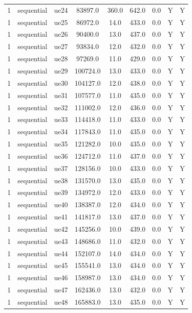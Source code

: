 \begin{table}[ht]
\begin{tabular}{|c|c|c|c|c|c|c|c|c|}
1 & sequential & ue24 & 83897.0 & 360.0 & 642.0 & 0.0 & Y & Y \\
1 & sequential & ue25 & 86972.0 & 14.0 & 433.0 & 0.0 & Y & Y \\
1 & sequential & ue26 & 90400.0 & 13.0 & 437.0 & 0.0 & Y & Y \\
1 & sequential & ue27 & 93834.0 & 12.0 & 432.0 & 0.0 & Y & Y \\
1 & sequential & ue28 & 97269.0 & 11.0 & 429.0 & 0.0 & Y & Y \\
1 & sequential & ue29 & 100724.0 & 13.0 & 433.0 & 0.0 & Y & Y \\
1 & sequential & ue30 & 104127.0 & 12.0 & 438.0 & 0.0 & Y & Y \\
1 & sequential & ue31 & 107577.0 & 11.0 & 435.0 & 0.0 & Y & Y \\
1 & sequential & ue32 & 111002.0 & 12.0 & 436.0 & 0.0 & Y & Y \\
1 & sequential & ue33 & 114418.0 & 11.0 & 433.0 & 0.0 & Y & Y \\
1 & sequential & ue34 & 117843.0 & 11.0 & 435.0 & 0.0 & Y & Y \\
1 & sequential & ue35 & 121282.0 & 10.0 & 435.0 & 0.0 & Y & Y \\
1 & sequential & ue36 & 124712.0 & 11.0 & 437.0 & 0.0 & Y & Y \\
1 & sequential & ue37 & 128156.0 & 10.0 & 433.0 & 0.0 & Y & Y \\
1 & sequential & ue38 & 131570.0 & 13.0 & 435.0 & 0.0 & Y & Y \\
1 & sequential & ue39 & 134972.0 & 12.0 & 433.0 & 0.0 & Y & Y \\
1 & sequential & ue40 & 138387.0 & 12.0 & 434.0 & 0.0 & Y & Y \\
1 & sequential & ue41 & 141817.0 & 13.0 & 437.0 & 0.0 & Y & Y \\
1 & sequential & ue42 & 145256.0 & 10.0 & 439.0 & 0.0 & Y & Y \\
1 & sequential & ue43 & 148686.0 & 11.0 & 432.0 & 0.0 & Y & Y \\
1 & sequential & ue44 & 152107.0 & 14.0 & 434.0 & 0.0 & Y & Y \\
1 & sequential & ue45 & 155541.0 & 13.0 & 434.0 & 0.0 & Y & Y \\
1 & sequential & ue46 & 158987.0 & 13.0 & 434.0 & 0.0 & Y & Y \\
1 & sequential & ue47 & 162436.0 & 13.0 & 432.0 & 0.0 & Y & Y \\
1 & sequential & ue48 & 165883.0 & 13.0 & 435.0 & 0.0 & Y & Y \\

\end{tabular}
\end{table}
